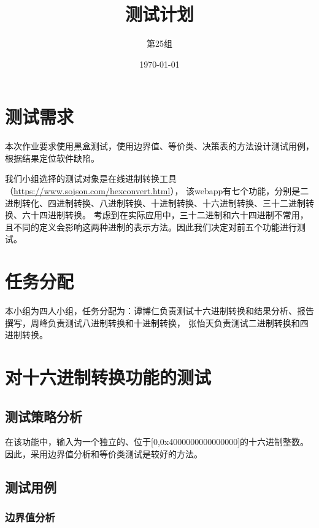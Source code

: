 \documentclass[12pt, a4paper, oneside]{ctexart}
\title{\textbf{测试计划}}
\author{第25组}
\date{\today}
\begin{document}
\maketitle
\section{测试需求}
本次作业要求使用黑盒测试，使用边界值、等价类、决策表的方法设计测试用例，根据结果定位软件缺陷。

我们小组选择的测试对象是在线进制转换工具（\url{https://www.sojson.com/hexconvert.html}），
该webapp有七个功能，分别是二进制转化、四进制转换、八进制转换、十进制转换、十六进制转换、三十二进制转换、六十四进制转换。
考虑到在实际应用中，三十二进制和六十四进制不常用，且不同的定义会影响这两种进制的表示方法。因此我们决定对前五个功能进行测试。

\section{任务分配}
本小组为四人小组，任务分配为：谭博仁负责测试十六进制转换和结果分析、报告撰写，周峰负责测试八进制转换和十进制转换，
张怡天负责测试二进制转换和四进制转换。


\section{对十六进制转换功能的测试}

\subsection{测试策略分析}

在该功能中，输入为一个独立的、位于[0,0x4000000000000000]的十六进制整数。因此，采用边界值分析和等价类测试是较好的方法。

\subsection{测试用例}

\subsubsection{边界值分析}
\end{document}
